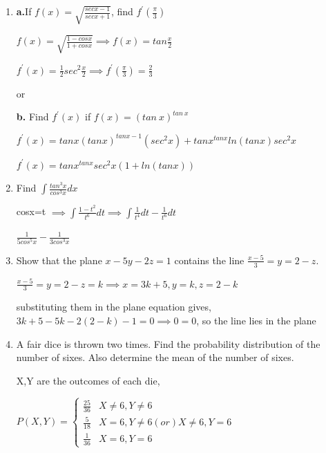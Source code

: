 \begin{enumerate}[label=\thesubsection.\arabic*, ref=\thesubsection.\theenumi]
    $\lambda^2+ 4\lambda +1=0 \implies A^2 +I= -4A \implies k=-4$


\item

\textbf{a.}If $f(x) =\sqrt{\frac{secx - 1}{secx + 1}}$, find $f^\prime {(\frac{\pi}{3})}$


\solution

$f(x)= \sqrt{\frac{1-cosx}{1+cosx}} \implies f(x)= tan\frac{x}{2}$

$f^\prime (x) = \frac{1}{2}{sec^2\frac{x}{2}} \implies  f^\prime(\frac{\pi}{3}) = \frac{2}{3}$

\begin{center}
    or 
\end{center}


\textbf{b.} Find $f^\prime(x)$ if $f(x)=(tan~x)^{tan~x}$

\solution

$f^\prime(x)= tanx(tanx)^{tanx -1}(sec^2x) + tanx^{tanx}ln(tanx)sec^2x$

$f^\prime(x)= tanx^{tanx}sec^2x\left(1 +ln(tanx)\right)$

\item

Find $\int \frac{tan^3x}{cos^3x}dx$

\solution

cosx=t $ \implies \int \frac{1-t^2}{t^6}dt \implies \int \frac{1}{t^4}dt-\frac{1}{t^6}dt$

$\frac{1}{5cos^5x}-\frac{1}{3cos^3x}$

\item 

Show that the plane $x-5y-2z=1$ contains the line $\frac{x-5}{3}=y=2-z.$ 

\solution

$\frac{x-5}{3}=y=2-z=k \implies x=3k+5 ,y=k,z=2-k$

substituting them in the plane equation gives, \newline $3k+5-5k-2(2-k)-1 =0 \implies 0=0 $, so the line lies in the plane 

\item

A fair dice is thrown two times. Find the probability distribution of the number of sixes. Also determine the mean of the number of sixes.

\solution

X,Y are the outcomes of each die,

$P(X,Y)=\begin{cases}
    \frac{25}{36}& X\neq6,Y\neq6 \\ \frac{5}{18}&X=6,Y\neq6 (or )X \neq 6 ,Y=6 \\ \frac{1}{36} & X=6 ,Y=6\end{cases}  $
    

\end{enumerate}
